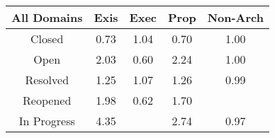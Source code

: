 \begin{tabular}{|c||c|c|c|c|}
\hline
All Domains & Exis & Exec & Prop & Non-Arch \\ 
\hline
Closed & \cellcolor[rgb]{0.809284214593029,0.36327861574033715,0.32599860028682703} 0.73 & \cellcolor[rgb]{0.9057427038209812,0.8379833860204647,0.42} 1.04 & \cellcolor[rgb]{0.7993587735621911,0.3162981948610377,0.3167348553247117} 0.70 & \cellcolor[rgb]{0.9098003882655672,0.8399054470731634,0.42} 1.00 \\ 
\hline
Open & \cellcolor[rgb]{0.7933714732426204,0.7847549083780834,0.42000000000000004} 2.03 & \cellcolor[rgb]{0.76,0.13,0.28} 0.60 & \cellcolor[rgb]{0.7693519929154701,0.7733772598020647,0.42} 2.24 & \cellcolor[rgb]{0.9095801115380583,0.839801105465396,0.42} 1.00 \\ 
\hline
Resolved & \cellcolor[rgb]{0.8816988962975146,0.8265942140356648,0.42} 1.25 & \cellcolor[rgb]{0.9024477740652788,0.8364226298203952,0.42} 1.07 & \cellcolor[rgb]{0.8804410270850538,0.8259983812508149,0.42} 1.26 & \cellcolor[rgb]{0.9078479243843078,0.8298135087523906,0.4179913960920207} 0.99 \\ 
\hline
Reopened & \cellcolor[rgb]{0.7989759685216375,0.7874096692997231,0.42} 1.98 & \cellcolor[rgb]{0.7690822281155569,0.17298921308030277,0.28847674624118647} 0.62 & \cellcolor[rgb]{0.8305106564524412,0.8023471530564195,0.41999999999999993} 1.70 &  \\ 
\hline
In Progress & \cellcolor[rgb]{0.53,0.66,0.42} 4.35 &  & \cellcolor[rgb]{0.7126393890827192,0.7465133948286564,0.42} 2.74 & \cellcolor[rgb]{0.897582307482998,0.7812229220861908,0.4084101536507982} 0.97 \\ 
\hline
\end{tabular}